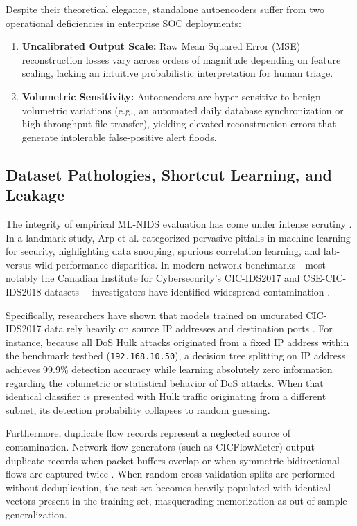 \documentclass[conference]{IEEEtran}
\begin{document}
Despite their theoretical elegance, standalone autoencoders suffer from two operational deficiencies in enterprise SOC deployments:
\begin{enumerate}
    \item \textbf{Uncalibrated Output Scale:} Raw Mean Squared Error (MSE) reconstruction losses vary across orders of magnitude depending on feature scaling, lacking an intuitive probabilistic interpretation for human triage.
    \item \textbf{Volumetric Sensitivity:} Autoencoders are hyper-sensitive to benign volumetric variations (e.g., an automated daily database synchronization or high-throughput file transfer), yielding elevated reconstruction errors that generate intolerable false-positive alert floods.
\end{enumerate}

\subsection{Dataset Pathologies, Shortcut Learning, and Leakage}
The integrity of empirical ML-NIDS evaluation has come under intense scrutiny \cite{haas2020aggressiveness, engelen2021troubleshooting}. In a landmark study, Arp et al. \cite{arp2022dos} categorized pervasive pitfalls in machine learning for security, highlighting data snooping, spurious correlation learning, and lab-versus-wild performance disparities. In modern network benchmarks---most notably the Canadian Institute for Cybersecurity's CIC-IDS2017 and CSE-CIC-IDS2018 datasets \cite{sharafaldin2018toward}---investigators have identified widespread contamination \cite{panigrahi2018detailed}.

Specifically, researchers have shown that models trained on uncurated CIC-IDS2017 data rely heavily on source IP addresses and destination ports \cite{rosay2020improving}. For instance, because all DoS Hulk attacks originated from a fixed IP address within the benchmark testbed (\texttt{192.168.10.50}), a decision tree splitting on IP address achieves 99.9\% detection accuracy while learning absolutely zero information regarding the volumetric or statistical behavior of DoS attacks. When that identical classifier is presented with Hulk traffic originating from a different subnet, its detection probability collapses to random guessing.

Furthermore, duplicate flow records represent a neglected source of contamination. Network flow generators (such as CICFlowMeter) output duplicate records when packet buffers overlap or when symmetric bidirectional flows are captured twice \cite{lashkari2017characterization}. When random cross-validation splits are performed without deduplication, the test set becomes heavily populated with identical vectors present in the training set, masquerading memorization as out-of-sample generalization.
\end{document}
